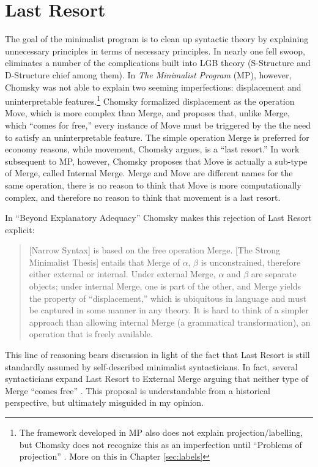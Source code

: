 \documentclass[MilwayThesis]{subfiles}
\begin{document}
\section{Last Resort}
The goal of the minimalist program is to clean up syntactic theory by explaining unnecessary principles in terms of necessary principles.
In nearly one fell swoop, \textcite{chomsky1995minimalist} eliminates a number of the complications built into LGB theory (S-Structure and D-Structure chief among them).
In \textit{The Minimalist Program} (MP), however, Chomsky was not able to explain two seeming imperfections: displacement and uninterpretable features.\footnote{
	The framework developed in MP also does not explain projection/labelling, but Chomsky does not recognize this as an imperfection until ``Problems of projection'' \parencite{chomsky2013problems}.
	More on this in Chapter \ref{sec:labels}
}
Chomsky formalized displacement as the operation Move, which is more complex than Merge, and proposes that, unlike Merge, which ``comes for free,'' every instance of Move must be triggered by the the need to satisfy an uninterpretable feature.
The simple operation Merge is preferred for economy reasons, while movement, Chomsky argues, is a ``last resort.''
In work subsequent to MP, however, Chomsky proposes that Move is actually a sub-type of Merge, called Internal Merge.
Merge and Move are different names for the same operation, there is no reason to think that Move is more computationally complex, and therefore no reason to think that movement is a last resort.

In ``Beyond Explanatory Adequacy'' \parencite[][henceforth, \textit{BEA}]{chomsky2004beyond} Chomsky makes this rejection of Last Resort explicit:
\begin{quote}
	[Narrow Syntax] is based on the free operation Merge.
	[The Strong Minimalist Thesis] entails that Merge of $\alpha$, $\beta$ is unconstrained, therefore either external or internal.
	Under external Merge, $\alpha$ and $\beta$ are separate objects; 
	under internal Merge, one is part of the other, and Merge yields the property of ``displacement,'' which is ubiquitous in language and must be captured in some manner in any theory. 
	It is hard to think of a simpler approach than allowing	internal Merge (a grammatical transformation), an operation that is freely available.
	\parencite[110]{chomsky2004beyond}
\end{quote}
This line of reasoning bears discussion in light of the fact that Last Resort is still standardly assumed by self-described minimalist syntacticians.
In fact, several syntacticians expand Last Resort to External Merge arguing that neither type of Merge ``comes free'' \parencite{pesetsky2006probes,frampton2008crash,wurmbrand2014merge,yokoyama2015features}.
This proposal is understandable from a historical perspective, but ultimately misguided in my opinion.
\end{document}

